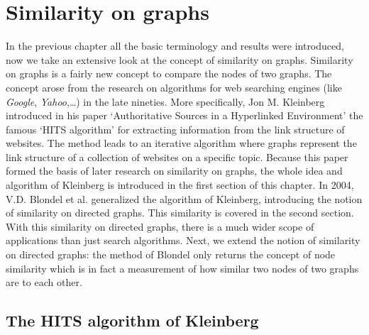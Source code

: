 \documentclass[a4paper,11pt]{report}
\begin{document}
\chapter{Similarity on graphs}

In the previous chapter all the basic terminology and results were introduced, 
now we take an extensive look at the concept of similarity on graphs. Similarity on graphs is a fairly new
concept to compare the nodes of two graphs. The concept arose from the research on algorithms for web searching engines (like \emph{Google}, \emph{Yahoo},\ldots) in the late nineties. 
More specifically, Jon M. Kleinberg 
introduced in his paper `Authoritative Sources in a Hyperlinked Environment' 
\cite{kleinberg} the famous `HITS algorithm' for extracting information from the link structure of websites. The method leads to an iterative algorithm where 
graphs represent the link structure of a collection of websites on a specific topic. Because this paper formed the basis of later research on similarity on graphs, 
the
whole idea and algorithm of Kleinberg is introduced in the first section of this chapter. In 
2004, V.D. Blondel et al. \cite{blondel} generalized the algorithm of 
Kleinberg, introducing the notion of similarity on directed graphs. This similarity is covered in the second section. With this similarity on directed graphs, 
there is a much wider scope of applications than just search algorithms. Next, we extend the notion of similarity on directed graphs: the method
of Blondel only returns the concept of node similarity which is in fact a 
measurement of how similar two nodes of two graphs are to each other.

\section{The HITS algorithm of Kleinberg}
\end{document}
